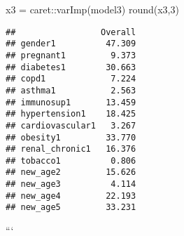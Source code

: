 \documentclass[
]{article}
\newenvironment{Shaded}{\begin{snugshade}}{\end{snugshade}}
\newcommand{\DecValTok}[1]{\textcolor[rgb]{0.00,0.00,0.81}{#1}}
\newcommand{\FunctionTok}[1]{\textcolor[rgb]{0.00,0.00,0.00}{#1}}
\newcommand{\NormalTok}[1]{#1}
\newcommand{\OtherTok}[1]{\textcolor[rgb]{0.56,0.35,0.01}{#1}}
\newcommand{\SpecialCharTok}[1]{\textcolor[rgb]{0.00,0.00,0.00}{#1}}
\begin{document}
\begin{Shaded}
\begin{Highlighting}[]
\NormalTok{x3 }\OtherTok{=}\NormalTok{ caret}\SpecialCharTok{::}\FunctionTok{varImp}\NormalTok{(model3)}
\FunctionTok{round}\NormalTok{(x3,}\DecValTok{3}\NormalTok{)}
\end{Highlighting}
\end{Shaded}

\begin{verbatim}
##                 Overall
## gender1          47.309
## pregnant1         9.373
## diabetes1        30.663
## copd1             7.224
## asthma1           2.563
## immunosup1       13.459
## hypertension1    18.425
## cardiovascular1   3.267
## obesity1         33.770
## renal_chronic1   16.376
## tobacco1          0.806
## new_age2         15.626
## new_age3          4.114
## new_age4         22.193
## new_age5         33.231
\end{verbatim}

```
\end{document}
